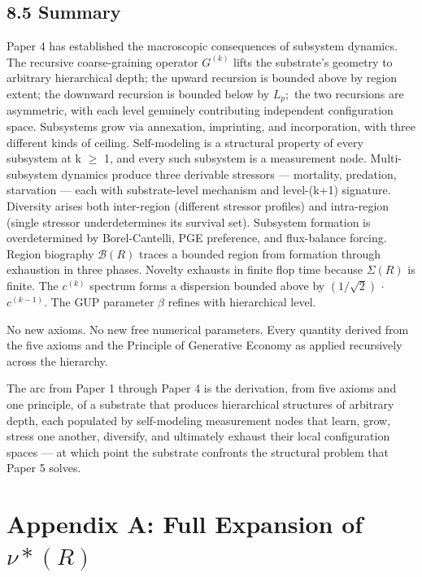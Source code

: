 \documentclass[11pt,oneside]{report}
\theoremstyle{definition}
\theoremstyle{remark}
\begin{document}
\subsection*{8.5 Summary}

Paper 4 has established the macroscopic consequences of subsystem
dynamics. The recursive coarse-graining operator \ensuremath{G^{(k)}} lifts the
substrate's geometry to arbitrary hierarchical depth; the upward
recursion is bounded above by region extent; the downward recursion is
bounded below by \ensuremath{L_{p};} the two recursions are asymmetric, with each
level genuinely contributing independent configuration space. Subsystems
grow via annexation, imprinting, and incorporation, with three different
kinds of ceiling. Self-modeling is a structural property of every
subsystem at k \ensuremath{\geq} 1, and every such subsystem is a measurement node.
Multi-subsystem dynamics produce three derivable stressors ---
mortality, predation, starvation --- each with substrate-level mechanism
and level-(k+1) signature. Diversity arises both inter-region (different
stressor profiles) and intra-region (single stressor underdetermines its
survival set). Subsystem formation is overdetermined by Borel-Cantelli,
PGE preference, and flux-balance forcing. Region biography \ensuremath{\mathcal{B}(R)} traces a
bounded region from formation through exhaustion in three phases.
Novelty exhausts in finite flop time because \textbar \ensuremath{\Sigma (R)}\textbar{} is
finite. The \ensuremath{c^{(k)}} spectrum forms a dispersion bounded above by \ensuremath{(1/\sqrt{2})}
\ensuremath{\cdot} \ensuremath{c^{(k-1)}.} The GUP parameter \ensuremath{\beta} refines with hierarchical level.

No new axioms. No new free numerical parameters. Every quantity derived
from the five axioms and the Principle of Generative Economy as applied
recursively across the hierarchy.

The arc from Paper 1 through Paper 4 is the derivation, from five axioms
and one principle, of a substrate that produces hierarchical structures
of arbitrary depth, each populated by self-modeling measurement nodes
that learn, grow, stress one another, diversify, and ultimately exhaust
their local configuration spaces --- at which point the substrate
confronts the structural problem that Paper 5 solves.

\section*{Appendix A: Full Expansion of \ensuremath{\nu *(R)}}
\end{document}
